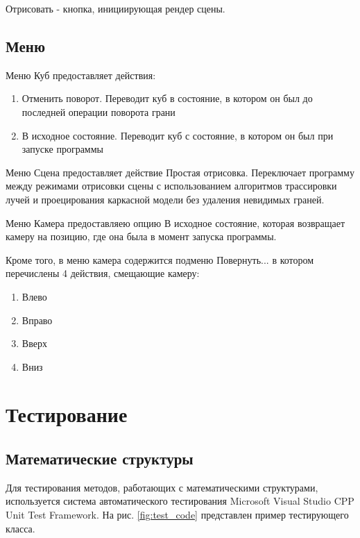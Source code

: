 \documentclass[a4paper, 14pt]{report} %
\begin{document}
	Отрисовать - кнопка, инициирующая рендер сцены.
	
	\subsection{Меню}
	Меню Куб предоставляет действия:
	\begin{enumerate}
	\item Отменить поворот. Переводит куб в состояние, в котором он был до последней операции поворота грани
	\item В исходное состояние. Переводит куб с состояние, в котором он был при запуске программы
	\end{enumerate}

	Меню Сцена предоставляет действие Простая отрисовка. Переключает программу между режимами отрисовки сцены с использованием алгоритмов трассировки лучей и проецирования каркасной модели без удаления невидимых граней.
	
	Меню Камера предоставляею опцию В исходное состояние, которая возвращает камеру на позицию, где она была в момент запуска программы.
	
	Кроме того, в меню камера содержится подменю Повернуть... в котором перечислены 4 действия, смещающие камеру:
	\begin{enumerate}
		\item Влево
		\item Вправо
		\item Вверх
		\item Вниз
	\end{enumerate}

	\section{Тестирование}
	\subsection{Математические структуры}
	Для тестирования методов, работающих с математическими структурами, используется система автоматического тестирования Microsoft Visual Studio CPP Unit Test Framework. На рис. \ref{fig:test_code} представлен пример тестирующего класса.
	
\end{document}
